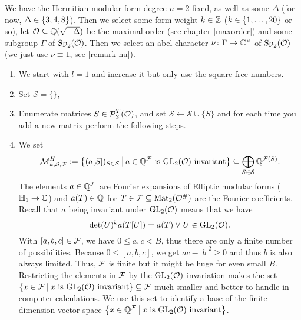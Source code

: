 \begin{algo}
We have the Hermitian modular form degree $n = 2$ fixed, as well as some $\Delta$ (for now, $\Delta \in \Set{3,4,8}$). Then we select some form weight $k \in \mathbb{Z}$ ($k \in \Set{1,\dots,20}$ or so), let $\mathcal{O} \subseteq \mathbb{Q}(\sqrt{-\Delta})$ be the maximal order (see chapter \ref{maxorder}) and some subgroup $\Gamma$ of $\operatorname{Sp}_2(\mathcal{O})$. Then we select an abel character $\nu \colon \Gamma \rightarrow \mathbb{C}^\times$ of $\operatorname{Sp}_2(\mathcal{O})$ (we just use $\nu \equiv 1$, see \cref{remark-nu}).

\begin{enumerate}
\item We start with $l = 1$ and increase it but only use the square-free numbers.
\item Set $\mathcal{S} = \{\}$,
\item\label{NextSStep} Enumerate matrices $S \in \operatorname{\mathcal{P}}_2^T(\mathcal{O})$, and set $\mathcal{S} \leftarrow \mathcal{S} \cup \{ S \}$ and for each time you add a new matrix perform the following steps.


\item
\newcommand{\FPrecisionLimit}[1]{\F(#1)}
We set
\[ \mathcal{M}_{k,\mathcal{S},\F}^H := \Set{ (a [S])_{S\in\mathcal{S}} }{\text{$a \in \Q^\F$ is $\GL_2(\curlO)$ invariant}} \subseteq \bigoplus_{S\in\mathcal{S}} \Q^{\FPrecisionLimit{S}} . \]
The elements $a \in \mathbb{Q}^{\mathcal{F}}$ are Fourier expansions of Elliptic modular forms ($\mathbb{H}_1 \rightarrow \mathbb{C}$) and $a(T) \in \mathbb{Q}$ for $T \in \mathcal{F} \subseteq \operatorname{Mat}_2(\mathcal{O}^\#)$ are the Fourier coefficients.
Recall that $a$ being invariant under $\operatorname{GL}_2(\mathcal{O})$ means that we have
\[ \det(U)^k a(T[U]) = a(T) \; \forall\ U \in \operatorname{GL}_2(\mathcal{O}) . \]
With $[a,b,c] \in \mathcal{F}$, we have $0\le a,c<B$, thus there are only a finite number of possibilities. Because $0 \le [a,b,c]$, we get $ac - \left| b \right|^2 \ge 0$ and thus $b$ is also always limited. Thus, $\mathcal{F}$ is finite but it might be huge for even small $B$. %
Restricting the elements in $\mathcal{F}$ by the $\operatorname{GL}_2(\mathcal{O})$-invariation makes the set $\invar{\F}{\GL_2(\curlO)} \subseteq \F$ much smaller and better to handle in computer calculations. We use this set to identify a base of the finite dimension vector space $\invar{\Q^\F}{\GL_2(\curlO)}$.


\end{enumerate}
\end{algo}
